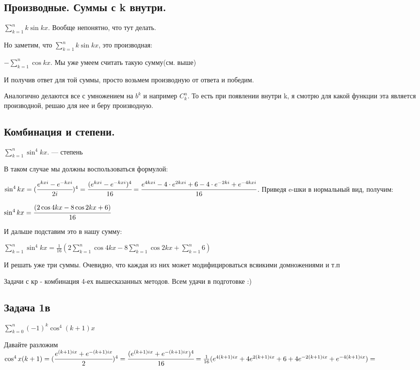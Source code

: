 \documentclass{article}
\begin{document}
\pagebreak
\subsection{Производные. Суммы с k внутри.}

$\sum\limits_{k=1}^n k\sin kx$. Вообще непонятно, что тут делать.

Но заметим, что $\sum\limits_{k=1}^n k\sin kx$, это производная:

$-\sum\limits_{k=1}^n \cos kx$. Мы уже умеем считать такую сумму(см. выше)

И получив ответ для той суммы, просто возьмем производную от ответа и победим.

Аналогично делаются все с умножением на $b^k$ и например $C_k^n$. То есть при появлении внутри k, я смотрю для какой функции эта является производной, решаю для нее и беру производную.

\pagebreak
\subsection{Комбинация и степени.}

$\sum\limits_{k=1}^n \sin^4 kx$. --- степень

В таком случае мы должны воспользоваться формулой:

$\sin^4 kx = (\cfrac{e^{kxi} - e^{-kxi}}{2i} )^4 =\cfrac{(e^{kxi} - e^{-kxi})^4}{16} =  \cfrac{e^{4kxi} -4\cdot e^{2kxi} +6 -4\cdot e^{-2ki}+ e^{-4kxi}}{16}$. Приведя e-шки в нормальный вид, получим:

$\sin^4 kx  = \cfrac{(2\cos 4kx -8 \cos 2kx + 6)}{16}$

И дальше подставим это в нашу сумму:

$\sum\limits_{k=1}^n \sin^4 kx = \frac{1}{16} (2\sum\limits_{k=1}^n \cos 4kx -8\sum\limits_{k=1}^n \cos 2kx + \sum\limits_{k=1}^n 6)$

И решать уже три суммы. Очевидно, что каждая из них может модифицироваться всяикими домножениями и т.п


Задачи с кр - комбинация 4-ех вышесказанных методов. Всем удачи в подготовке :)
\pagebreak

\subsection{Задача 1в}

$\sum\limits_{k=0}^n  (-1)^k \cos^4 (k+1) x$

Давайте разложим $\cos^4 x(k+1) = (\cfrac{e^{(k+1)ix}+ e^{-(k+1)ix}}{2})^4= \cfrac{(e^{(k+1)ix}+ e^{-(k+1)ix})^4}{16} = \frac{1}{16} (e^{4(k+1)ix}+4e^{2(k+1)ix}+6+4e^{-2(k+1)ix}+e^{-4(k+1)ix}) = $
\end{document}

